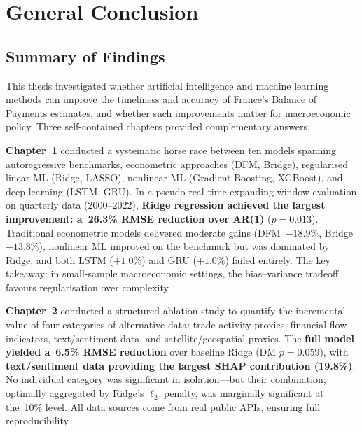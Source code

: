 \chapter*{General Conclusion}


\section*{Summary of Findings}

This thesis investigated whether artificial intelligence and machine learning methods can improve the timeliness and accuracy of France's Balance of Payments estimates, and whether such improvements matter for macroeconomic policy.  Three self-contained chapters provided complementary answers.

\textbf{Chapter~1} conducted a systematic horse race between ten models spanning autoregressive benchmarks, econometric approaches (DFM, Bridge), regularised linear ML (Ridge, LASSO), nonlinear ML (Gradient Boosting, XGBoost), and deep learning (LSTM, GRU).  In a pseudo-real-time expanding-window evaluation on quarterly data (2000--2022), \textbf{Ridge regression achieved the largest improvement: a~26.3\% RMSE reduction over AR(1)} ($p = 0.013$).  Traditional econometric models delivered moderate gains (DFM~$-18.9\%$, Bridge~$-13.8\%$), nonlinear ML improved on the benchmark but was dominated by Ridge, and both LSTM ($+1.0\%$) and GRU ($+1.0\%$) failed entirely.  The key takeaway: in small-sample macroeconomic settings, the bias--variance tradeoff favours regularisation over complexity.

\textbf{Chapter~2} conducted a structured ablation study to quantify the incremental value of four categories of alternative data: trade-activity proxies, financial-flow indicators, text/sentiment data, and satellite/geospatial proxies.  The \textbf{full model yielded a~6.5\% RMSE reduction} over baseline Ridge (DM $p = 0.059$), with \textbf{text/sentiment data providing the largest SHAP contribution (19.8\%)}.  No individual category was significant in isolation---but their combination, optimally aggregated by Ridge's $\ell_2$ penalty, was marginally significant at the~10\% level.  All data sources come from real public APIs, ensuring full reproducibility.

